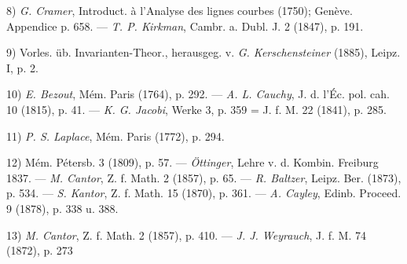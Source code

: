 \vfill
\leftline{\rule{2in}{0.4pt}}
\vspace{0.2cm}
{
\footnotesize
8) \textit{G. Cramer}, Introduct. à l'Analyse des lignes courbes (1750); Genève. Appendice p. 658. — \textit{T. P. Kirkman}, Cambr. a. Dubl. J. 2 (1847), p. 191.

9) Vorles. üb. Invarianten-Theor., herausgeg. v. \textit{G. Kerschensteiner} (1885), Leipz. I, p. 2.

10) \textit{E. Bezout}, Mém. Paris (1764), p. 292. — \textit{A. L. Cauchy}, J. d. l'Éc. pol. cah. 10 (1815), p. 41. — \textit{K. G. Jacobi}, Werke 3, p. 359 = J. f. M. 22 (1841), p. 285.

11) \textit{P. S. Laplace}, Mém. Paris (1772), p. 294.

12) Mém. Pétersb. 3 (1809), p. 57. — \textit{Öttinger}, Lehre v. d. Kombin. Freiburg 1837. — \textit{M. Cantor}, Z. f. Math. 2 (1857), p. 65. — \textit{R. Baltzer}, Leipz. Ber. (1873), p. 534. — \textit{S. Kantor}, Z. f. Math. 15 (1870), p. 361. — \textit{A. Cayley}, Edinb. Proceed. 9 (1878), p. 338 u. 388.

13) \textit{M. Cantor}, Z. f. Math. 2 (1857), p. 410. — \textit{J. J. Weyrauch}, J. f. M. 74 (1872), p. 273

}
